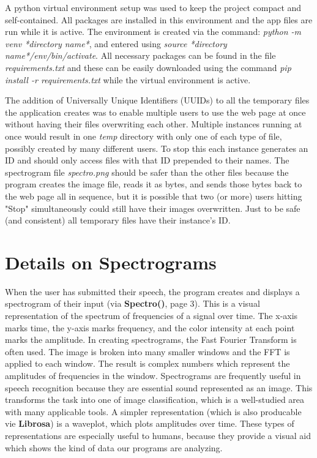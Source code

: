 \documentclass[12pt, letterpaper]{article}
\begin{document}
A python virtual environment setup was used to keep the project compact and self-contained. All packages are installed in this environment and the app files are run while it is active. The environment is created via the command: \textit{python -m venv *directory name*}, and entered using \textit{source *directory name*/env/bin/activate}. All necessary packages can be found in the file \textit{requirements.txt} and these can be easily downloaded using the command \textit{pip install -r requirements.txt} while the virtual environment is active.

The addition of Universally Unique Identifiers (UUIDs) to all the temporary files the application creates was to enable multiple users to use the web page at once without having their files overwriting each other. Multiple instances running at once would result in one \textit{temp} directory with only one of each type of file, possibly created by many different users. To stop this each instance generates an ID and should only access files with that ID prepended to their names. The spectrogram file \textit{spectro.png} should be safer than the other files because the program creates the image file, reads it as bytes, and sends those bytes back to the web page all in sequence, but it is possible that two (or more) users hitting "Stop" simultaneously could still have their images overwritten. Just to be safe  (and consistent) all temporary files have their instance's ID.

\section*{Details on Spectrograms}
When the user has submitted their speech, the program creates and displays a spectrogram of their input (via \textbf{Spectro()}, page 3). This is a visual representation of the spectrum of frequencies of a signal over time. The x-axis marks time, the y-axis marks frequency, and the color intensity at each point marks the amplitude. In creating spectrograms, the Fast Fourier Transform is often used. The image is broken into many smaller windows and the FFT is applied to each window. The result is complex numbers which represent the amplitudes of frequencies in the window. Spectrograms are frequently useful in speech recognition because they are essential sound represented as an image. This transforms the task into one of image classification, which is a well-studied area with many applicable tools. A simpler representation (which is also producable vie \textbf{Librosa}) is a waveplot, which plots amplitudes over time. These types of representations are especially useful to humans, because they provide a visual aid which shows the kind of data our programs are analyzing.
\end{document}
